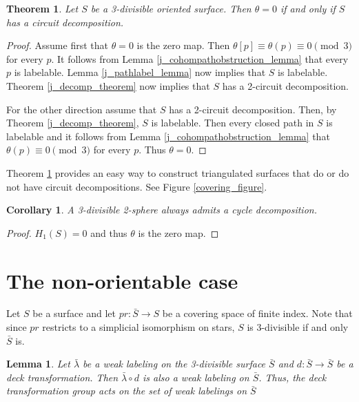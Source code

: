 \documentclass[12pt]{article}
\newtheorem{theorem}{Theorem}
\newtheorem{lemma}{Lemma}
\newtheorem{corollary}{Corollary}
\theoremstyle{definition}
\begin{document}
\begin{theorem}\label{j_cohom_theorem}
    Let $S$ be a 3-divisible oriented surface. Then $\theta=0$ if and only if $S$ has a circuit decomposition.
\end{theorem}

\begin{proof}
    Assume first that $\theta=0$ is the zero map. Then $\theta[p]\equiv\theta(p)\equiv0\pmod3$ for every $p$. It follows from Lemma \ref{j_cohompathobstruction_lemma} that every $p$ is labelable. Lemma \ref{j_pathlabel_lemma} now implies that $S$ is labelable. Theorem \ref{j_decomp_theorem} now implies that $S$ has a 2-circuit decomposition.
    
    For the other direction assume that $S$ has a 2-circuit decomposition. Then, by Theorem \ref{j_decomp_theorem}, $S$ is labelable. Then every closed path in $S$ is labelable and it follows from Lemma \ref{j_cohompathobstruction_lemma} that $\theta(p)\equiv0\pmod3$ for every $p$. Thus $\theta=0$.
\end{proof}

Theorem \ref{j_cohom_theorem} provides an easy way to construct triangulated surfaces that do or do not have circuit decompositions. See Figure \ref{covering_figure}.

\begin{corollary}\label{j_sphere_corollary}
    A 3-divisible 2-sphere always admits a cycle decomposition.
\end{corollary}
\begin{proof}
    $H_1(S)=0$ and thus $\theta$ is the zero map.
\end{proof}



\section{The non-orientable case}

Let $S$ be a surface and let $pr\colon\bar S\to S$ be a covering space of finite index. Note that since $pr$ restricts to a simplicial isomorphism on stars, $S$ is 3-divisible if and only $\bar S$ is.

\begin{lemma}\label{j_deck_trafo_lemma}
    Let $\bar\lambda$ be a weak labeling on the 3-divisible surface $\bar S$ and $d\colon \bar S\to \bar S$ be a deck transformation. Then $\bar \lambda\circ d$ is also a weak labeling on $\bar S$. Thus, the deck transformation group acts on the set of weak labelings on $\bar S$
\end{lemma}
\end{document}

